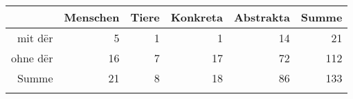 \begin{tabular}{rrrrrr}
  \lsptoprule
 & Menschen & Tiere & Konkreta & Abstrakta & Summe \\ 
  \midrule
mit dër & 5 & 1 & 1 & 14 & 21 \\ 
  ohne dër & 16 & 7 & 17 & 72 & 112 \\ 
  Summe & 21 & 8 & 18 & 86 & 133 \\ 
   \lspbottomrule
\end{tabular}
